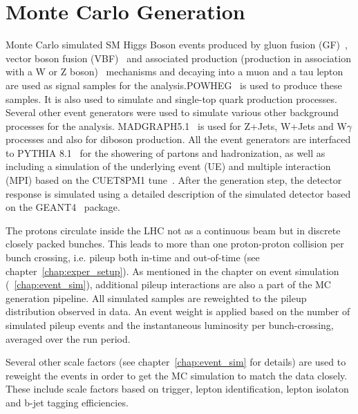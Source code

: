\section{Monte Carlo Generation}
\label{mc_gen}

Monte Carlo simulated SM Higgs Boson events produced by  gluon fusion (GF)~\cite{Georgi_GF}, vector boson fusion (VBF)~\cite{Cahn:1986zv} and associated production (production in association with a W or Z boson)~\cite{Glashow:1978ab} mechanisms and decaying into a muon and a tau lepton are used as signal samples for the analysis.POWHEG~\cite{Nason:2004rx,Frixione:2007vw, Alioli:2010xd, Alioli:2010xa, Alioli:2008tz, Bagnaschi:2011tu} is used to produce these samples. It is also used to simulate \ttb and single-top quark production processes. Several other event generators were used to simulate various other background processes for the analysis. MADGRAPH5.1~\cite{Alwall:2011uj} is used for Z+Jets, W+Jets and W$\gamma$ processes and also for diboson production. All the event generators are interfaced to PYTHIA 8.1~\cite{Sjostrand:pythia8} for the showering of partons and hadronization, as well as including a simulation of the underlying event (UE) and multiple interaction (MPI) based on the CUET8PM1 tune~\cite{Khachatryan:2015pea}. After the generation step, the detector response is simulated using a detailed description of the simulated detector based on the GEANT4~\cite{GEANT4} package.

The protons circulate inside the LHC not as a continuous beam but in discrete closely packed bunches. This leads to more than one proton-proton collision per bunch crossing, i.e. pileup both in-time and out-of-time (see chapter~\ref{chap:exper_setup}). As mentioned in the chapter on event simulation (~\ref{chap:event_sim}), additional pileup interactions are also a part of the MC generation pipeline. All simulated samples are reweighted to the pileup distribution observed in data. An event weight is applied based on the number of simulated pileup events and the instantaneous luminosity per bunch-crossing, averaged over the run period.

Several other scale factors (see chapter~\ref{chap:event_sim} for details) are used to reweight the events in order to get the MC simulation to match the data closely. These include scale factors based on trigger, lepton identification, lepton isolaton and b-jet tagging efficiencies.



%
% 
% 

%
% 
% 
